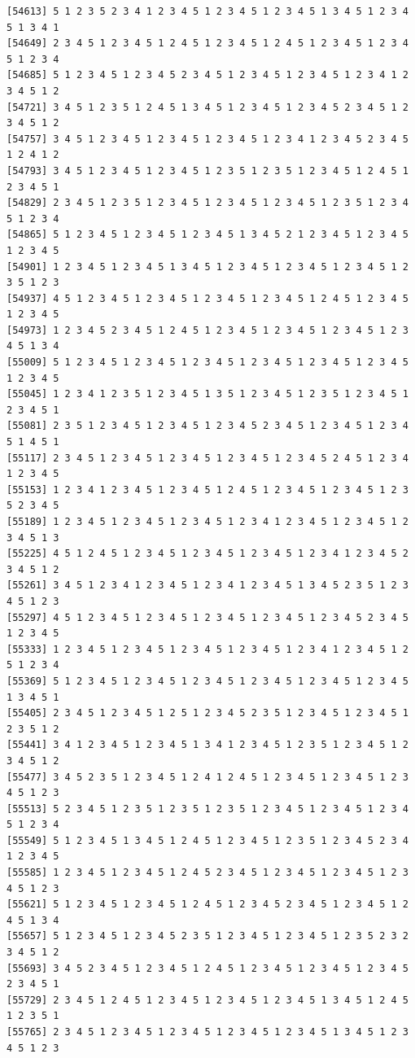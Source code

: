 \documentclass[
  11pt,
]{book}
\begin{document}
\begin{verbatim}
[54613] 5 1 2 3 5 2 3 4 1 2 3 4 5 1 2 3 4 5 1 2 3 4 5 1 3 4 5 1 2 3 4 5 1 3 4 1
[54649] 2 3 4 5 1 2 3 4 5 1 2 4 5 1 2 3 4 5 1 2 4 5 1 2 3 4 5 1 2 3 4 5 1 2 3 4
[54685] 5 1 2 3 4 5 1 2 3 4 5 2 3 4 5 1 2 3 4 5 1 2 3 4 5 1 2 3 4 1 2 3 4 5 1 2
[54721] 3 4 5 1 2 3 5 1 2 4 5 1 3 4 5 1 2 3 4 5 1 2 3 4 5 2 3 4 5 1 2 3 4 5 1 2
[54757] 3 4 5 1 2 3 4 5 1 2 3 4 5 1 2 3 4 5 1 2 3 4 1 2 3 4 5 2 3 4 5 1 2 4 1 2
[54793] 3 4 5 1 2 3 4 5 1 2 3 4 5 1 2 3 5 1 2 3 5 1 2 3 4 5 1 2 4 5 1 2 3 4 5 1
[54829] 2 3 4 5 1 2 3 5 1 2 3 4 5 1 2 3 4 5 1 2 3 4 5 1 2 3 5 1 2 3 4 5 1 2 3 4
[54865] 5 1 2 3 4 5 1 2 3 4 5 1 2 3 4 5 1 3 4 5 2 1 2 3 4 5 1 2 3 4 5 1 2 3 4 5
[54901] 1 2 3 4 5 1 2 3 4 5 1 3 4 5 1 2 3 4 5 1 2 3 4 5 1 2 3 4 5 1 2 3 5 1 2 3
[54937] 4 5 1 2 3 4 5 1 2 3 4 5 1 2 3 4 5 1 2 3 4 5 1 2 4 5 1 2 3 4 5 1 2 3 4 5
[54973] 1 2 3 4 5 2 3 4 5 1 2 4 5 1 2 3 4 5 1 2 3 4 5 1 2 3 4 5 1 2 3 4 5 1 3 4
[55009] 5 1 2 3 4 5 1 2 3 4 5 1 2 3 4 5 1 2 3 4 5 1 2 3 4 5 1 2 3 4 5 1 2 3 4 5
[55045] 1 2 3 4 1 2 3 5 1 2 3 4 5 1 3 5 1 2 3 4 5 1 2 3 5 1 2 3 4 5 1 2 3 4 5 1
[55081] 2 3 5 1 2 3 4 5 1 2 3 4 5 1 2 3 4 5 2 3 4 5 1 2 3 4 5 1 2 3 4 5 1 4 5 1
[55117] 2 3 4 5 1 2 3 4 5 1 2 3 4 5 1 2 3 4 5 1 2 3 4 5 2 4 5 1 2 3 4 1 2 3 4 5
[55153] 1 2 3 4 1 2 3 4 5 1 2 3 4 5 1 2 4 5 1 2 3 4 5 1 2 3 4 5 1 2 3 5 2 3 4 5
[55189] 1 2 3 4 5 1 2 3 4 5 1 2 3 4 5 1 2 3 4 1 2 3 4 5 1 2 3 4 5 1 2 3 4 5 1 3
[55225] 4 5 1 2 4 5 1 2 3 4 5 1 2 3 4 5 1 2 3 4 5 1 2 3 4 1 2 3 4 5 2 3 4 5 1 2
[55261] 3 4 5 1 2 3 4 1 2 3 4 5 1 2 3 4 1 2 3 4 5 1 3 4 5 2 3 5 1 2 3 4 5 1 2 3
[55297] 4 5 1 2 3 4 5 1 2 3 4 5 1 2 3 4 5 1 2 3 4 5 1 2 3 4 5 2 3 4 5 1 2 3 4 5
[55333] 1 2 3 4 5 1 2 3 4 5 1 2 3 4 5 1 2 3 4 5 1 2 3 4 1 2 3 4 5 1 2 5 1 2 3 4
[55369] 5 1 2 3 4 5 1 2 3 4 5 1 2 3 4 5 1 2 3 4 5 1 2 3 4 5 1 2 3 4 5 1 3 4 5 1
[55405] 2 3 4 5 1 2 3 4 5 1 2 5 1 2 3 4 5 2 3 5 1 2 3 4 5 1 2 3 4 5 1 2 3 5 1 2
[55441] 3 4 1 2 3 4 5 1 2 3 4 5 1 3 4 1 2 3 4 5 1 2 3 5 1 2 3 4 5 1 2 3 4 5 1 2
[55477] 3 4 5 2 3 5 1 2 3 4 5 1 2 4 1 2 4 5 1 2 3 4 5 1 2 3 4 5 1 2 3 4 5 1 2 3
[55513] 5 2 3 4 5 1 2 3 5 1 2 3 5 1 2 3 5 1 2 3 4 5 1 2 3 4 5 1 2 3 4 5 1 2 3 4
[55549] 5 1 2 3 4 5 1 3 4 5 1 2 4 5 1 2 3 4 5 1 2 3 5 1 2 3 4 5 2 3 4 1 2 3 4 5
[55585] 1 2 3 4 5 1 2 3 4 5 1 2 4 5 2 3 4 5 1 2 3 4 5 1 2 3 4 5 1 2 3 4 5 1 2 3
[55621] 5 1 2 3 4 5 1 2 3 4 5 1 2 4 5 1 2 3 4 5 2 3 4 5 1 2 3 4 5 1 2 4 5 1 3 4
[55657] 5 1 2 3 4 5 1 2 3 4 5 2 3 5 1 2 3 4 5 1 2 3 4 5 1 2 3 5 2 3 2 3 4 5 1 2
[55693] 3 4 5 2 3 4 5 1 2 3 4 5 1 2 4 5 1 2 3 4 5 1 2 3 4 5 1 2 3 4 5 2 3 4 5 1
[55729] 2 3 4 5 1 2 4 5 1 2 3 4 5 1 2 3 4 5 1 2 3 4 5 1 3 4 5 1 2 4 5 1 2 3 5 1
[55765] 2 3 4 5 1 2 3 4 5 1 2 3 4 5 1 2 3 4 5 1 2 3 4 5 1 3 4 5 1 2 3 4 5 1 2 3

\end{verbatim}
\end{document}
